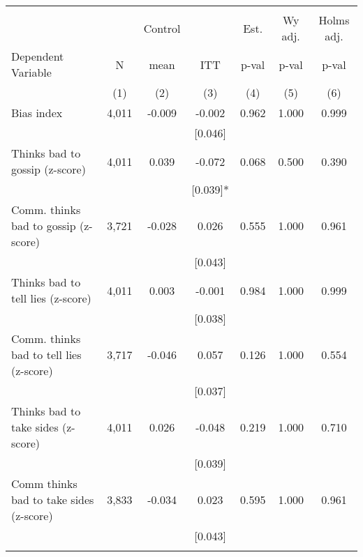 \begin{tabular}{lcccccc}
\hline \noalign{\smallskip} &  &  &  &  &  & \\
 &  & Control &  & Est. & Wy adj. & Holms adj.\\
Dependent Variable & N & mean & ITT & p-val & p-val & p-val\\
 & (1) & (2) & (3) & (4) & (5) & (6)\\
\noalign{\smallskip}\hline \noalign{\smallskip}Bias index & 4,011 & -0.009 & -0.002 & 0.962 & 1.000 & 0.999\\
 &  &  & [0.046] &  &  & \\
\quad Thinks bad to gossip (z-score) & 4,011 & 0.039 & -0.072 & 0.068 & 0.500 & 0.390\\
 &  &  & [0.039]* &  &  & \\
\quad Comm. thinks bad to gossip (z-score) & 3,721 & -0.028 & 0.026 & 0.555 & 1.000 & 0.961\\
 &  &  & [0.043] &  &  & \\
\quad Thinks bad to tell lies (z-score) & 4,011 & 0.003 & -0.001 & 0.984 & 1.000 & 0.999\\
 &  &  & [0.038] &  &  & \\
\quad Comm. thinks bad to tell lies (z-score) & 3,717 & -0.046 & 0.057 & 0.126 & 1.000 & 0.554\\
 &  &  & [0.037] &  &  & \\
\quad Thinks bad to take sides (z-score) & 4,011 & 0.026 & -0.048 & 0.219 & 1.000 & 0.710\\
 &  &  & [0.039] &  &  & \\
\quad Comm thinks bad to take sides (z-score) & 3,833 & -0.034 & 0.023 & 0.595 & 1.000 & 0.961\\
 &  &  & [0.043] &  &  & \\
\noalign{\smallskip}\hline\end{tabular}
